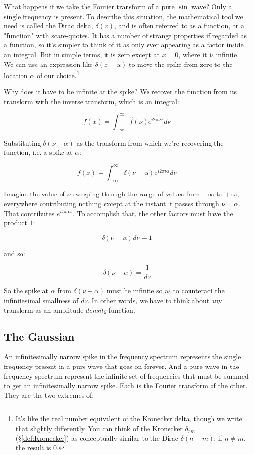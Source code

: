 What happens if we take the Fourier transform of a pure $\sin$ wave? Only a single frequency is present. To describe this situation, the mathematical tool we need is called the Dirac delta, $\delta(x)$, and is often referred to as a function, or a "function" with scare-quotes. It has a number of strange properties if regarded as a function, so it's simpler to think of it as only ever appearing as a factor inside an integral. But in simple terms, it is zero except at $x = 0$, where it is infinite. We can use an expression like $\delta(x - \alpha)$ to move the spike from zero to the location $\alpha$ of our choice.\footnote{It's like the real number equivalent of the Kronecker delta, though we write that slightly differently. You can think of the Kronecker $\delta_{nm}$ (§\ref{def:Kronecker}) as conceptually similar to the Dirac $\delta(n - m)$: if $n \ne m$, the result is $0$.}

Why does it have to be infinite at the spike? We recover the function from its transform with the inverse transform, which is an integral:

$$
f(x) = \int_{-\infty}^{\infty} \hat{f}(\nu)e^{i2\pi\nu x} d\nu
$$

Substituting $\delta(\nu - \alpha)$ as the transform from which we're recovering the function, i.e. a spike at $\alpha$:

$$
f(x) = \int_{-\infty}^{\infty} \delta(\nu - \alpha)e^{i2\pi\nu x} d\nu
$$

Imagine the value of $\nu$ sweeping through the range of values from $-\infty$ to $+\infty$, everywhere contributing nothing except at the instant it passes through $\nu = \alpha$. That contributes $e^{i2\pi\alpha x}$. To accomplish that, the other factors must have the product $1$:

$$
\delta(\nu - \alpha) d\nu = 1
$$

and so:

$$
\delta(\nu - \alpha) = \frac{1}{d\nu}
$$

So the spike at $\alpha$ from $\delta(\nu - \alpha)$ must be infinite so as to counteract the infinitesimal smallness of $d\nu$. In other words, we have to think about any transform as an amplitude \textit{density} function.

\subsection{The Gaussian}

An infinitesimally narrow spike in the frequency spectrum represents the single frequency present in a pure wave that goes on forever. And a pure wave in the frequency spectrum represent the infinite set of frequencies that must be summed to get an infinitesimally narrow spike. Each is the Fourier transform of the other. They are the two extremes of:

